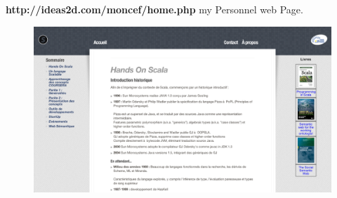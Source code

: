 \documentclass[11pt]{article} %
\begin{document}
\newpage
\textbf{http://ideas2d.com/moncef/home.php} my Personnel web Page.
\begin{figure}[H]
        \centering
                \centering
                \includegraphics[width=\textwidth]{idea2d.png}
               
\end{figure}
\end{document}
